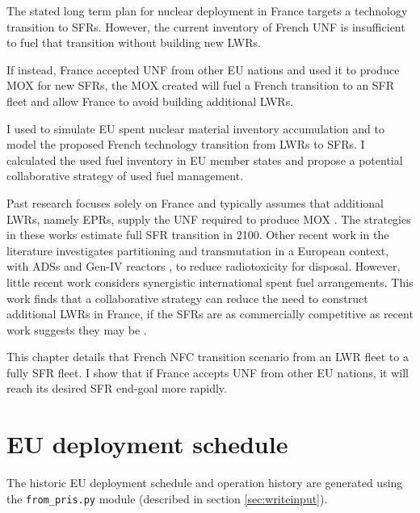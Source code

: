 
The stated long term plan for nuclear deployment in France targets a technology 
transition to \glspl{SFR}\cite{cne2_reports_2015}. However, the current inventory of French \gls{UNF} 
is insufficient to fuel that transition without building new \glspl{LWR}.

If instead, France accepted 
\gls{UNF} from other \gls{EU} nations and used it to produce \gls{MOX} for new \glspl{SFR},
the \gls{MOX} created will fuel a French transition to an \gls{SFR} fleet
and allow France to avoid building additional \glspl{LWR}.

I used \Cyclus to simulate
 \gls{EU} spent nuclear material inventory accumulation and to model the 
 proposed French 
 technology transition from \glspl{LWR} to
 \glspl{SFR}. I calculated the used fuel
inventory in \gls{EU} member states and propose a potential collaborative
strategy of used fuel management.

Past research focuses solely on France and typically assumes that additional \glspl{LWR},
namely \glspl{EPR}, supply the \gls{UNF} required to produce \gls{MOX} 
\cite{carre_overview_2009, martin_symbiotic_2017, freynet_multiobjective_2016, merino_rodriguez_analysis_2014}.
The strategies in these works estimate full \gls{SFR} transition in 2100.
Other recent work in the literature investigates partitioning and transmutation
in a European context, with \glspl{ADS} and Gen-IV reactors \cite{fazio_study_2013,
alvarez-velarde_analysis_2008},
to reduce radiotoxicity for disposal.
However, little recent work considers synergistic international spent fuel arrangements.
This work finds that a collaborative strategy can reduce the
need to construct additional \glspl{LWR} in France, if 
the \glspl{SFR} are as commercially competitive as recent work
suggests they may be \cite{zhao_improving_2009}.

This chapter details that French \gls{NFC} transition
scenario from an \gls{LWR} fleet to a fully \gls{SFR} fleet.
I show that if France accepts \gls{UNF} from other \gls{EU} nations,
it will reach its desired \gls{SFR} end-goal more rapidly.


\section{\gls{EU} deployment schedule}

The historic \gls{EU} deployment schedule and operation history 
are generated using the \texttt{from\_pris.py}
module (described in section \ref{sec:writeinput}).

